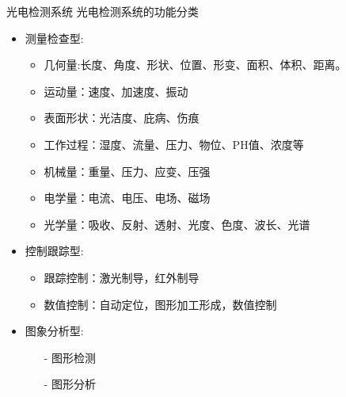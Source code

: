 \documentclass[10pt]{beamer}
\begin{document}
\begin{frame}{光电检测系统}
光电检测系统的功能分类
    \begin{itemize}
        \item \alert{测量检查型:}
        \begin{itemize}
            \item<2-| alert@2>[-] 几何量:长度、角度、形状、位置、形变、面积、体积、距离。
            \item<2-| alert@3>[-] 运动量：速度、加速度、振动
            \item<2-| alert@4>[-] 表面形状：光洁度、庇病、伤痕
            \item<2-| alert@5>[-] 工作过程：湿度、流量、压力、物位、PH值、浓度等
            \item<2-| alert@6>[-]  机械量：重量、压力、应变、压强
            \item<2-| alert@7>[-] 电学量：电流、电压、电场、磁场
            \item<2-| alert@8>[-] 光学量：吸收、反射、透射、光度、色度、波长、光谱

        \end{itemize}
        \item \alert{控制跟踪型:}
        \begin{itemize}
            \item<2-| alert@9>[-] 跟踪控制：激光制导，红外制导
            \item<2-| alert@10>[-] 数值控制：自动定位，图形加工形成，数值控制
        \end{itemize}
        \item \alert{图象分析型:}
        \begin{itemize}
            \item[-] 图形检测
            \item[-]图形分析
        \end{itemize}


    \end{itemize}
\end{frame}
\end{document}
